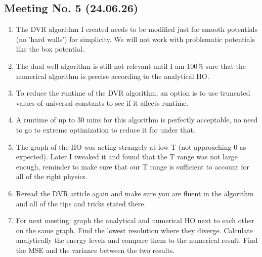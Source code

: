 \documentclass{article}
\numberwithin{equation}{subsection}
\begin{document}
\subsection*{Meeting No. 5 (24.06.26)}
\begin{enumerate}[label=\textbf{\Alph*.}]
    \item The DVR algorithm I created needs to be modified just for smooth potentials (no 'hard walls') for simplicity. We will not work with problematic potentials like the box potential.
    \item The dual well algorithm is still not relevant until I am 100\% sure that the numerical algorithm is precise according to the analytical HO.
    \item To reduce the runtime of the DVR algorithm, an option is to use truncated values of universal constants to see if it affects runtime.
    \item A runtime of up to 30 mins for this algorithm is perfectly acceptable, no need to go to extreme optimization to reduce it for under that.
    \item The graph of the HO was acting strangely at low T (not approaching 0 as expected). Later I tweaked it and found that the T range was not large enough, reminder to make sure that our T range is sufficient to account for all of the right physics.
    \item Reread the DVR article again and make sure you are fluent in the algorithm and all of the tips and tricks stated there.
    \item For next meeting: graph the analytical and numerical HO next to each other on the same graph. Find the lowest resolution where they diverge. Calculate analytically the energy levels and compare them to the numerical result. Find the MSE and the variance between the two results. 
\end{enumerate}
\end{document}
